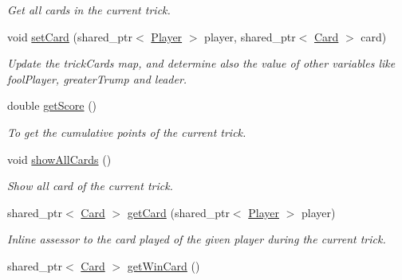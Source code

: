 \begin{DoxyCompactItemize}
\begin{DoxyCompactList}\small\item\em \-Get all cards in the current trick. \end{DoxyCompactList}\item 
void \hyperlink{classTrick_a4d2b4c09c8d7c255ff34bde5fe29532a}{set\-Card} (shared\-\_\-ptr$<$ \hyperlink{classPlayer}{\-Player} $>$ player, shared\-\_\-ptr$<$ \hyperlink{classCard}{\-Card} $>$ card)
\begin{DoxyCompactList}\small\item\em \-Update the trick\-Cards map, and determine also the value of other variables like fool\-Player, greater\-Trump and leader. \end{DoxyCompactList}\item 
\hypertarget{classTrick_ae5b1563e923896a2fe0c5a09113b494b}{double \hyperlink{classTrick_ae5b1563e923896a2fe0c5a09113b494b}{get\-Score} ()}\label{classTrick_ae5b1563e923896a2fe0c5a09113b494b}

\begin{DoxyCompactList}\small\item\em \-To get the cumulative points of the current trick. \end{DoxyCompactList}\item 
\hypertarget{classTrick_a24eae8424ae5666d362dc0a9e514faa4}{void \hyperlink{classTrick_a24eae8424ae5666d362dc0a9e514faa4}{show\-All\-Cards} ()}\label{classTrick_a24eae8424ae5666d362dc0a9e514faa4}

\begin{DoxyCompactList}\small\item\em \-Show all card of the current trick. \end{DoxyCompactList}\item 
\hypertarget{classTrick_a29246478abfaf149e3ba10396e3f1b05}{shared\-\_\-ptr$<$ \hyperlink{classCard}{\-Card} $>$ \hyperlink{classTrick_a29246478abfaf149e3ba10396e3f1b05}{get\-Card} (shared\-\_\-ptr$<$ \hyperlink{classPlayer}{\-Player} $>$ player)}\label{classTrick_a29246478abfaf149e3ba10396e3f1b05}

\begin{DoxyCompactList}\small\item\em \-Inline assessor to the card played of the given player during the current trick. \end{DoxyCompactList}\item 
\hypertarget{classTrick_a38816b1d7ccd9c8d576539463b6de715}{shared\-\_\-ptr$<$ \hyperlink{classCard}{\-Card} $>$ \hyperlink{classTrick_a38816b1d7ccd9c8d576539463b6de715}{get\-Win\-Card} ()}\label{classTrick_a38816b1d7ccd9c8d576539463b6de715}


\end{DoxyCompactItemize}
